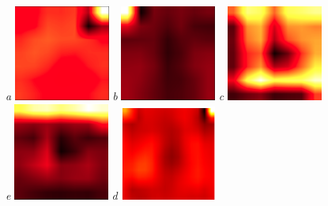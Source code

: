 \documentclass[12pt,oneside,a4paper]{report}
\begin{document}
\begin{figure}[H]
  \centering
  \emph{a} \includegraphics[width=0.28\textwidth]{images/heatmap_224_noda}\hspace{0.01\textwidth}%
  \emph{b} \includegraphics[width=0.28\textwidth]{images/heatmap_224_da}\hspace{0.01\textwidth}%
  \emph{c} \includegraphics[width=0.28\textwidth]{images/heatmap_224_cropped}\\[0.01\textwidth]
  \hspace{0\textwidth}
  \emph{e} \includegraphics[width=0.28\textwidth]{images/heatmap_224_no_in}\hspace{0.01\textwidth}%
  \emph{d} \includegraphics[width=0.28\textwidth]{images/heatmap_224_guangzhou}\hspace{0.15\textwidth}\\[0.01\textwidth]

\end{figure}
\end{document}
